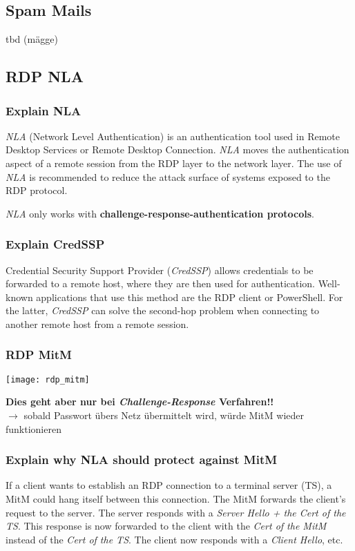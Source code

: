 \subsection{Spam Mails}
tbd (mägge)

\newpage

\subsection{RDP NLA}

\subsubsection{Explain NLA}
\textit{NLA} (Network Level Authentication) is an authentication tool used in Remote Desktop Services or Remote Desktop Connection.
\textit{NLA} moves the authentication aspect of a remote session from the RDP layer to the network layer. The use of \textit{NLA} is recommended to reduce the attack surface of systems exposed to the RDP protocol.

\textit{NLA} only works with \textbf{challenge-response-authentication protocols}.

\subsubsection{Explain CredSSP}
Credential Security Support Provider (\textit{CredSSP}) allows credentials to be forwarded to a remote host, where they are then used for authentication. Well-known applications that use this method are the RDP client or PowerShell. For the latter, \textit{CredSSP} can solve the second-hop problem when connecting to another remote host from a remote session.

\subsubsection{RDP MitM}
\begin{center}
    \texttt{[image: rdp\_mitm]}
\end{center}

\textbf{Dies geht aber nur bei \textit{Challenge-Response} Verfahren!!}\\
$\rightarrow$ sobald Passwort übers Netz übermittelt wird, würde MitM wieder funktionieren

\subsubsection{Explain why NLA should protect against MitM}
If a client wants to establish an RDP connection to a terminal server (TS), a MitM could hang itself between this connection.
The MitM forwards the client's request to the server. The server responds with a \textit{Server Hello + the Cert of the TS}. This response is now forwarded to the client with the \textit{Cert of the MitM} instead of the \textit{Cert of the TS}. The client now responds with a \textit{Client Hello}, etc.


